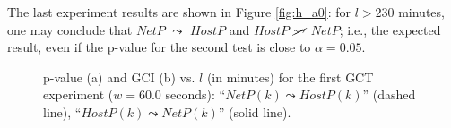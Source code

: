 The last experiment results are shown in Figure \ref{fig:h_a0}: for $l
> 230$ minutes, one may conclude that $NetP$ $\leadsto$ $HostP$ and
$HostP$ $\cancel{\leadsto}$ $NetP$; i.e., the expected result, even if
the p-value for the second test is close to $\alpha = 0.05$.

\begin{figure}[p]
  \centering
  
  
  
  \caption{p-value (a) and \ac{GCI} (b) vs. $l$ (in minutes) for the
    first \ac{GCT} experiment ($w = 60.0$ seconds): ``$NetP(k)
    \leadsto HostP(k)$'' (dashed line), ``$HostP(k) \leadsto
    NetP(k)$'' (solid line).}
  \label{fig:minute_a0}
\end{figure}

